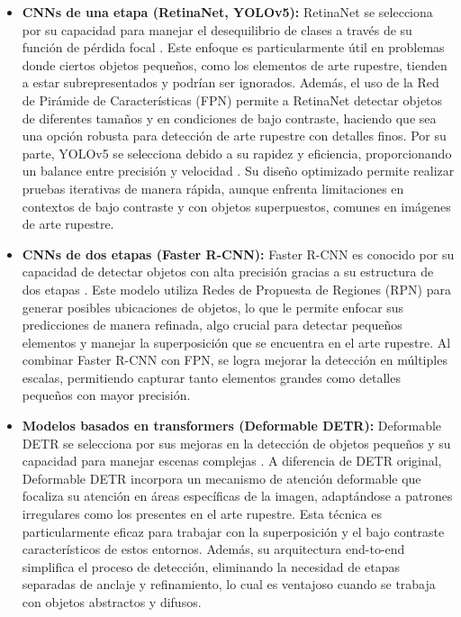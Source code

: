\begin{itemize}
    \item \textbf{CNNs de una etapa (RetinaNet, YOLOv5):} RetinaNet se selecciona por su capacidad para manejar el desequilibrio de clases a través de su función de pérdida focal \cite{lin2017focal}. Este enfoque es particularmente útil en problemas donde ciertos objetos pequeños, como los elementos de arte rupestre, tienden a estar subrepresentados y podrían ser ignorados. Además, el uso de la Red de Pirámide de Características (FPN) permite a RetinaNet detectar objetos de diferentes tamaños y en condiciones de bajo contraste, haciendo que sea una opción robusta para detección de arte rupestre con detalles finos. Por su parte, YOLOv5 se selecciona debido a su rapidez y eficiencia, proporcionando un balance entre precisión y velocidad \cite{yolov5}. Su diseño optimizado permite realizar pruebas iterativas de manera rápida, aunque enfrenta limitaciones en contextos de bajo contraste y con objetos superpuestos, comunes en imágenes de arte rupestre.

    \item \textbf{CNNs de dos etapas (Faster R-CNN):} Faster R-CNN es conocido por su capacidad de detectar objetos con alta precisión gracias a su estructura de dos etapas \cite{ren2015faster}. Este modelo utiliza Redes de Propuesta de Regiones (RPN) para generar posibles ubicaciones de objetos, lo que le permite enfocar sus predicciones de manera refinada, algo crucial para detectar pequeños elementos y manejar la superposición que se encuentra en el arte rupestre. Al combinar Faster R-CNN con FPN, se logra mejorar la detección en múltiples escalas, permitiendo capturar tanto elementos grandes como detalles pequeños con mayor precisión.

    \item \textbf{Modelos basados en transformers (Deformable DETR):} Deformable DETR se selecciona por sus mejoras en la detección de objetos pequeños y su capacidad para manejar escenas complejas \cite{zhu2021deformable}. A diferencia de DETR original, Deformable DETR incorpora un mecanismo de atención deformable que focaliza su atención en áreas específicas de la imagen, adaptándose a patrones irregulares como los presentes en el arte rupestre. Esta técnica es particularmente eficaz para trabajar con la superposición y el bajo contraste característicos de estos entornos. Además, su arquitectura end-to-end simplifica el proceso de detección, eliminando la necesidad de etapas separadas de anclaje y refinamiento, lo cual es ventajoso cuando se trabaja con objetos abstractos y difusos.
\end{itemize}

